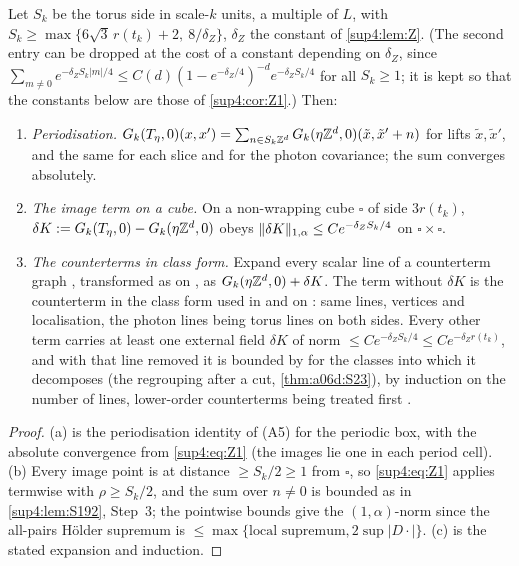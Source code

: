 \begin{lemma}\label{sup4:lem:F2}
Let $S_k$ be the torus side in scale-$k$ units, a multiple of $L$, with $S_k\ge\max\{6\sqrt3\,r(t_k)+2,\ 8/\delta_Z\}$, $\delta_Z$ the constant of \cref{sup4:lem:Z}. (The second entry can be dropped at the cost of a constant depending on $\delta_Z$, since $\sum_{m\ne0}e^{-\delta_ZS_k|m|/4}\le C(d)(1-e^{-\delta_Z/4})^{-d}e^{-\delta_ZS_k/4}$ for all $S_k\ge1$; it is kept so that the constants below are those of \cref{sup4:cor:Z1}.) Then:
\begin{enumerate}[label=\textup{(\alph*)},nosep,leftmargin=*]
\item \emph{Periodisation.} $G_k(T_\eta,0)(x,x')=\sum_{n\in S_k\mathbb Z^d}G_k(\eta\mathbb Z^d,0)(\tilde x,\tilde x'+n)$ for lifts $\tilde x,\tilde x'$, and the same for each slice and for the photon covariance; the sum converges absolutely.
\item \emph{The image term on a cube.} On a non-wrapping cube $\square$ of side $3r(t_k)$, $\delta K:= G_k(T_\eta,0)-G_k(\eta\mathbb Z^d,0)$ obeys $\lVert \delta K\rVert_{1,\alpha}\le Ce^{-\delta_ZS_k/4}$ on $\square\times\square$.
\item \emph{The counterterms in class form.} Expand every scalar line of a counterterm graph \cite[(1.26)--(1.31)]{Ba3}, transformed as on \cite[p.~433]{Ba3}, as $G_k(\eta\mathbb Z^d,0)+\delta K$. The term without $\delta K$ is the counterterm in the class form used in \cite[(3.7)--(3.9), (3.19)]{Ba3} and on \cite[pp.~444--445]{Ba3}: same lines, vertices and localisation, the photon lines being torus lines on both sides. Every other term carries at least one external field $\delta K$ of norm $\le Ce^{-\delta_ZS_k/4}\le Ce^{-\delta_Zr(t_k)}$, and with that line removed it is bounded by \cite[(3.3)]{Ba3} for the classes into which it decomposes (the regrouping after a cut, \cref{thm:a06d:S23}), by induction on the number of lines, lower-order counterterms being treated first \cite[p.~417]{Ba3}.
\end{enumerate}
\end{lemma}

\begin{proof}
(a) is the periodisation identity of (A5) for the periodic box, with the absolute convergence from \eqref{sup4:eq:Z1} (the images lie one in each period cell). (b) Every image point is at distance $\ge S_k/2\ge1$ from $\square$, so \eqref{sup4:eq:Z1} applies termwise with $\rho\ge S_k/2$, and the sum over $n\ne0$ is bounded as in \cref{sup4:lem:S192}, Step~3; the pointwise bounds give the $(1,\alpha)$-norm since the all-pairs H\"older supremum is $\le\max\{\text{local supremum},2\sup|D\cdot|\}$. (c) is the stated expansion and induction.
\end{proof}

